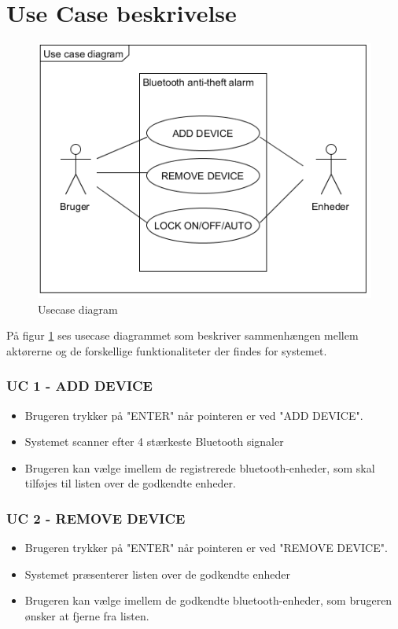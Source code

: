 \section{Use Case beskrivelse}

\begin{figure}[H]
	\centering
	\includegraphics[width = 300 pt]{Img/Usecase_Diagram.png}
	\caption{Usecase diagram}
	\label{fig:Usecase diagram}
\end{figure}

På figur \ref{fig:Usecase diagram} ses usecase diagrammet som beskriver sammenhængen mellem aktørerne og de forskellige funktionaliteter der findes for systemet.

\subsubsection{UC 1 - ADD DEVICE}
\begin{itemize}
\item Brugeren trykker på "ENTER" når pointeren er ved "ADD DEVICE".
\item Systemet scanner efter 4 stærkeste Bluetooth signaler
\item Brugeren kan vælge imellem de registrerede bluetooth-enheder, som skal tilføjes til listen over de godkendte enheder.
\end{itemize}


\subsubsection{UC 2 - REMOVE DEVICE}

\begin{itemize}
	\item Brugeren trykker på "ENTER" når pointeren er ved "REMOVE DEVICE".
	\item Systemet præsenterer listen over de godkendte enheder
	\item Brugeren kan vælge imellem de godkendte bluetooth-enheder, som brugeren ønsker at fjerne fra listen.
\end{itemize} 

